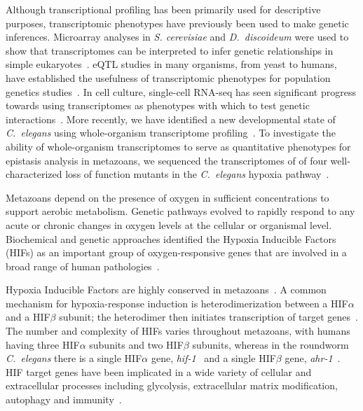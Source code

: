\documentclass[9pt,twocolumn,twoside]{pnas-new}
\newcommand{\cel}{\emph{C.~elegans}}
\newcommand{\dicty}{\emph{D.~discoideum}}
\newcommand{\gene}[1]{\emph{#1}}
\begin{document}
Although transcriptional profiling has been primarily used for descriptive purposes,
transcriptomic phenotypes have previously been used to make genetic inferences.
Microarray analyses in \emph{S. cerevisiae} and \dicty{} were used to show
that transcriptomes can be interpreted to infer genetic relationships in simple
eukaryotes~\cite{Hughes2000, VanDriessche2005}. eQTL studies in
many organisms, from yeast to humans, have established the usefulness of
transcriptomic phenotypes for population genetics studies~\cite{Brem2002,Schadt2003,
Li2006,King2014}. In cell culture, single-cell RNA-seq has seen significant
progress towards using transcriptomes as phenotypes with which to test genetic
interactions~\cite{Adamson2016,Dixit2016}.
More recently, we have identified a new developmental state
of \cel{} using whole-organism transcriptome profiling~\cite{Angeles-Albores2016a}.
To investigate the ability of whole-organism transcriptomes to serve as quantitative
phenotypes for epistasis analysis in metazoans, we sequenced the transcriptomes of
of four well-characterized loss of function mutants in the \cel{} hypoxia
pathway~\cite{Epstein2001,Shen2006,Shao2009,Jiang2001}.

Metazoans depend on the presence of oxygen in sufficient concentrations to
support aerobic metabolism. Genetic pathways evolved to rapidly respond to any
acute or chronic changes in oxygen levels at the cellular or organismal level.
Biochemical and genetic approaches identified the Hypoxia Inducible Factors
(HIFs) as an important group of oxygen-responsive genes that are involved in a
broad range of human pathologies~\cite{Semenza2012}.

Hypoxia Inducible Factors are highly conserved in metazoans~\cite{Loenarz2011}.
A common mechanism for hypoxia-response induction is heterodimerization between a
HIF$\alpha$ and a HIF$\beta$ subunit; the heterodimer then initiates
transcription of target genes~\cite{Jiang1996}. The number and complexity of
HIFs varies throughout metazoans, with humans having three HIF$\alpha$ subunits
and two HIF$\beta$ subunits, whereas in the roundworm \cel{} there is a single
HIF$\alpha$ gene, \gene{hif-1}~\cite{Jiang2001} and a single HIF$\beta$
gene, \gene{ahr-1}~\cite{Powell-Coffman1998}. HIF target genes have been implicated
in a wide variety of cellular and extracellular processes including glycolysis,
extracellular matrix modification, autophagy and immunity~\cite{Semenza1994,
Bishop2004,Shen2005,Bellier2009,Semenza2012}.
\end{document}

